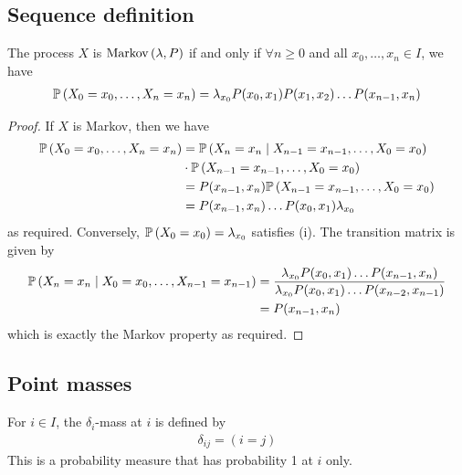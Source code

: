 \subsection{Sequence definition}
\begin{theorem}
	The process $X$ is $\operatorname{Markov}\left({\lambda, P}\right)$ if and only if $\forall n \geq 0$ and all $x_0, \dots, x_n \in I$, we have
	\begin{align*}
		\mathbb{P}\left({X_0 = x_0, \dots, X_n = x_n}\right) = \lambda_{x_0} P(x_0, x_1) P(x_1, x_2) \dots P(x_{n-1}, x_n)
	\end{align*}
\end{theorem}
\begin{proof}
	If $X$ is Markov, then we have
	\begin{align*}
		\mathbb{P}\left({X_0 = x_0, \dots, X_n = x_n}\right) & = \mathbb{P}\left({X_n = x_n \mid X_{n-1} = x_{n-1}, \dots, X_0 = x_0}\right)  \\
		& \cdot \mathbb{P}\left({X_{n-1} = x_{n-1}, \dots, X_0 = x_0}\right)             \\
		& = P(x_{n-1}, x_n) \mathbb{P}\left({X_{n-1} = x_{n-1}, \dots, X_0 = x_0}\right) \\
		& = P(x_{n-1}, x_n) \dots P(x_0, x_1) \lambda_{x_0}
	\end{align*}
	as required.
	Conversely, $\mathbb{P}\left({X_0 = x_0}\right) = \lambda_{x_0}$ satisfies (i).
	The transition matrix is given by
	\begin{align*}
		\mathbb{P}\left({X_n = x_n \mid X_0 = x_0, \dots, X_{n-1} = x_{n-1}}\right) &= \frac{\lambda_{x_0} P(x_0, x_1) \dots P(x_{n-1}, x_n)}{\lambda_{x_0} P(x_0, x_1) \dots P(x_{n-2}, x_{n-1})} \\
		&= P(x_{n-1}, x_n)
	\end{align*}
	which is exactly the Markov property as required.
\end{proof}

\subsection{Point masses}
\begin{definition}
	For $i \in I$, the $\delta_i$-mass at $i$ is defined by
	\begin{align*}
		\delta_{ij} =  (i = j)
	\end{align*}
	This is a probability measure that has probability 1 at $i$ only.
\end{definition}

